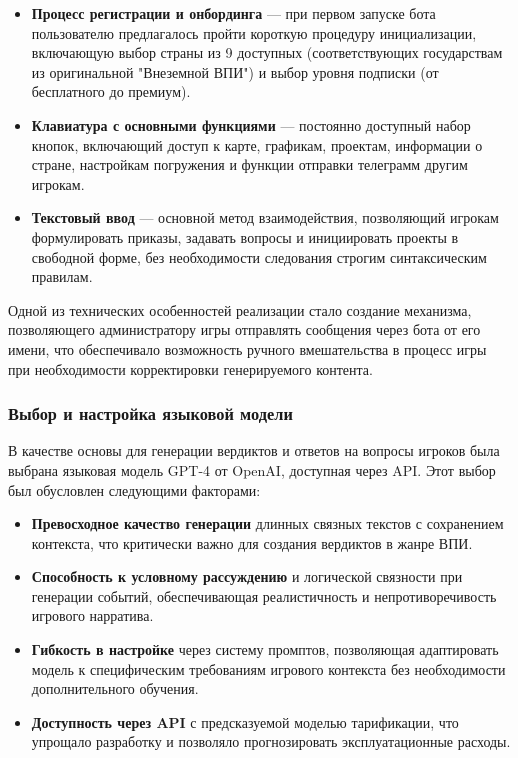 \begin{itemize}
    \item \textbf{Процесс регистрации и онбординга} — при первом запуске бота пользователю предлагалось пройти короткую процедуру инициализации, включающую выбор страны из 9 доступных (соответствующих государствам из оригинальной "Внеземной ВПИ") и выбор уровня подписки (от бесплатного до премиум).

    \item \textbf{Клавиатура с основными функциями} — постоянно доступный набор кнопок, включающий доступ к карте, графикам, проектам, информации о стране, настройкам погружения и функции отправки телеграмм другим игрокам.

    \item \textbf{Текстовый ввод} — основной метод взаимодействия, позволяющий игрокам формулировать приказы, задавать вопросы и инициировать проекты в свободной форме, без необходимости следования строгим синтаксическим правилам.
\end{itemize}

Одной из технических особенностей реализации стало создание механизма, позволяющего администратору игры отправлять сообщения через бота от его имени, что обеспечивало возможность ручного вмешательства в процесс игры при необходимости корректировки генерируемого контента.

\subsubsection{Выбор и настройка языковой модели}

В качестве основы для генерации вердиктов и ответов на вопросы игроков была выбрана языковая модель GPT-4 от OpenAI, доступная через API. Этот выбор был обусловлен следующими факторами:

\begin{itemize}
    \item \textbf{Превосходное качество генерации} длинных связных текстов с сохранением контекста, что критически важно для создания вердиктов в жанре ВПИ.

    \item \textbf{Способность к условному рассуждению} и логической связности при генерации событий, обеспечивающая реалистичность и непротиворечивость игрового нарратива.

    \item \textbf{Гибкость в настройке} через систему промптов, позволяющая адаптировать модель к специфическим требованиям игрового контекста без необходимости дополнительного обучения.

    \item \textbf{Доступность через API} с предсказуемой моделью тарификации, что упрощало разработку и позволяло прогнозировать эксплуатационные расходы.
\end{itemize}

